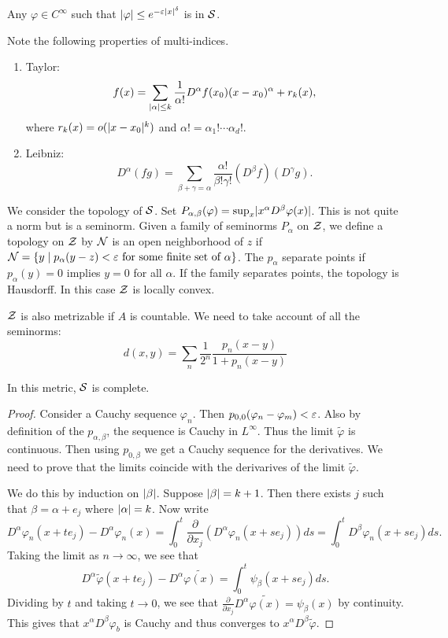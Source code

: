 \documentclass[10pt, twoside]{article}
\begin{document}
    Any $\varphi \in C^{\infty}$ such that $\lvert\varphi\rvert\leq e^{-\varepsilon
    \lvert x\rvert^{\delta}}$ is in $\mathcal{S}$.

    Note the following properties of multi-indices.  \begin{enumerate} \item
        Taylor: \[f(x) = \sum_{\lvert\alpha\rvert \leq k} \frac{1}{\alpha !}
        D^{\alpha} f(x_0)(x-x_0)^{\alpha} + r_k(x), \] where $r_k(x) =
        o(\lvert x-x_0\rvert^k)$ and $\alpha ! = \alpha_1! \cdots \alpha_d!$.  \item
    Leibniz: \[D^{\alpha}(fg) = \sum_{\beta + \gamma = \alpha} \frac{\alpha
!}{\beta!\gamma!} (D^{\beta}f)(D^{\gamma}g). \] \end{enumerate}

    We consider the topology of $\mathcal{S}$. Set $P_{\alpha, \beta}(\varphi) =
    \sup_x \lvert x^{\alpha}D^{\beta} \varphi(x)\rvert$. This is not quite a norm but
    is a seminorm. Given a family of seminorms $P_{\alpha}$ on $\mathcal{Z}$, we
    define a topology on $\mathcal{Z}$ by $\mathcal{N}$ is an open neighborhood of $z$ if
    $\mathcal{N} = \{y \mid p_{\alpha}(y-z) < \varepsilon \text{ for some finite set of
    }\alpha \}$. The $p_{\alpha}$ separate points if $p_{\alpha}(y) = 0$
    implies $y = 0$ for all $\alpha$. If the family separates points, the
    topology is Hausdorff. In this case $\mathcal{Z}$ is locally convex.

    $\mathcal{Z}$ is also metrizable if $A$ is countable. We need to take account of
    all the seminorms: \[d(x,y) = \sum_n \frac{1}{2^n}
    \frac{p_n(x-y)}{1+p_n(x-y)} \]

    \begin{thm} In this metric, $\mathcal{S}$ is complete.  \begin{proof} Consider a
        Cauchy sequence $\varphi_n$. Then $p_{0,0}(\varphi_n-\varphi_m) < \varepsilon$.
        Also by definition of the $p_{\alpha,\beta}$, the sequence is Cauchy in
        $L^{\infty}$.  Thus the limit $\widetilde{\varphi}$ is continuous. Then
        using $p_{0,\beta}$ we get a Cauchy sequence for the derivatives. We
        need to prove that the limits coincide with the derivarives of the
        limit $\widetilde{\varphi}$.

            We do this by induction on $\lvert\beta\rvert$. Suppose $\lvert\beta\rvert =
            k+1$. Then there exists $j$ such that $\beta = \alpha + e_j$ where
            $\lvert\alpha\rvert = k$. Now write \[D^{\alpha} \varphi_n(x+te_j) -
                D^{\alpha} \varphi_n(x) = \int_0^t \frac{\partial}{\partial
                x_j} \left( D^{\alpha} \varphi_n(x+se_j) \right) ds = \int_0^t
                D^{\beta} \varphi_n(x+se_j) ds. \] Taking the limit as $n \to
                \infty$, we see that \[D^{\alpha} \widetilde{\varphi}(x+te_j) -
                D^{\alpha}\widetilde{\varphi(x)} = \int_0^t
            \psi_{\beta}(x+se_j)ds.\] Dividing by $t$ and taking $t \to 0$, we
        see that $\frac{\partial}{\partial x_j} D^{\alpha}
    \widetilde{\varphi(x)} = \psi_{\beta}(x)$ by continuity. This gives that
$x^{\alpha}D^{\beta} \varphi_b$ is Cauchy and thus converges to
$x^{\alpha}D^{\beta}\widetilde{\varphi}$.  \end{proof} \end{thm}
\end{document}
